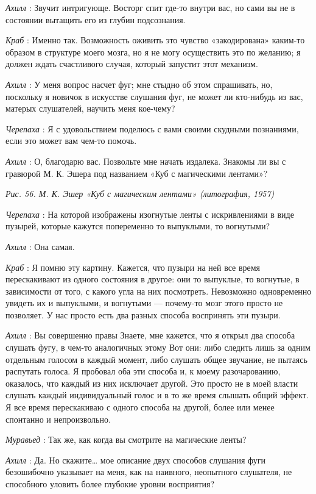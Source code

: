 \emph{Ахилл} : Звучит интригующе. Восторг спит где-то внутри вас, но сами вы не в состоянии вытащить его из глубин подсознания.

\emph{Краб} : Именно так. Возможность оживить это чувство «закодирована» каким-то образом в структуре моего мозга, но я не могу осуществить это по желанию; я должен ждать счастливого случая, который запустит этот механизм.

\emph{Ахилл} : У меня вопрос насчет фуг; мне стыдно об этом спрашивать, но, поскольку я новичок в искусстве слушания фуг, не может ли кто-нибудь из вас, матерых слушателей, научить меня кое-чему?

\emph{Черепаха} : Я с удовольствием поделюсь с вами своими скудными познаниями, если это может вам чем-то помочь.

\emph{Ахилл} : О, благодарю вас. Позвольте мне начать издалека. Знакомы ли вы с гравюрой М. К. Эшера под названием «Куб с магическими лентами»?

\emph{Рис. 56. М. К. Эшер «Куб с магическим лентами» (литография, 1957)}

\emph{Черепаха} : На которой изображены изогнутые ленты с искривлениями в виде пузырей, которые кажутся попеременно то выпуклыми, то вогнутыми?

\emph{Ахилл} : Она самая.

\emph{Краб} : Я помню эту картину. Кажется, что пузыри на ней все время перескакивают из одного состояния в другое: они то выпуклые, то вогнутые, в зависимости от того, с какого угла на них посмотреть. Невозможно одновременно увидеть их и выпуклыми, и вогнутыми --- почему-то мозг этого просто не позволяет. У нас просто есть два разных способа воспринять эти пузыри.

\emph{Ахилл} : Вы совершенно правы Знаете, мне кажется, что я открыл два способа слушать фугу, в чем-то аналогичных этому Вот они: либо следить лишь за одним отдельным голосом в каждый момент, либо слушать общее звучание, не пытаясь распутать голоса. Я пробовал оба эти способа и, к моему разочарованию, оказалось, что каждый из них исключает другой. Это просто не в моей власти слушать каждый индивидуальный голос и в то же время слышать общий эффект. Я все время перескакиваю с одного способа на другой, более или менее спонтанно и непроизвольно.

\emph{Муравьед} : Так же, как когда вы смотрите на магические ленты?

\emph{Ахилл} : Да. Но скажите\ldots{} мое описание двух способов слушания фуги безошибочно указывает на меня, как на наивного, неопытного слушателя, не способного уловить более глубокие уровни восприятия?

